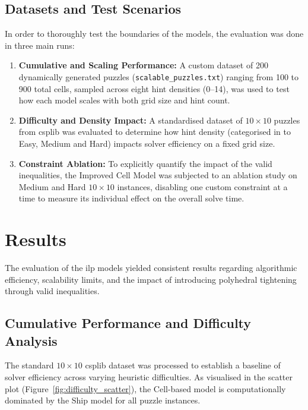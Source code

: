 \subsection{Datasets and Test Scenarios}\label{subsec:datasets-test-scenarios}
In order to thoroughly test the boundaries of the models, the evaluation was done in three main runs:
\begin{enumerate}
  \item \textbf{Cumulative and Scaling Performance:} A custom dataset of \num{200} dynamically generated puzzles (\verb|scalable_puzzles.txt|) ranging from \num{100} to \num{900} total cells, sampled across eight hint densities (0--14), was used to test how each model scales with both grid size and hint count.
  \item \textbf{Difficulty and Density Impact:} A standardised dataset of $10 \times 10$ puzzles from \gls{csplib} \citep{csplib:prob014} was evaluated to determine how hint density (categorised in to Easy, Medium and Hard) impacts solver efficiency on a fixed grid size.
  \item \textbf{Constraint Ablation:} To explicitly quantify the impact of the valid inequalities, the Improved Cell Model was subjected to an ablation study on Medium and Hard $10 \times 10$ instances, disabling one custom constraint at a time to measure its individual effect on the overall solve time.
\end{enumerate}

\section{Results}\label{sec:results}

The evaluation of the \gls{ilp} models yielded consistent results regarding algorithmic efficiency, scalability limits, and the impact of introducing polyhedral tightening through valid inequalities.

\subsection{Cumulative Performance and Difficulty Analysis}\label{subsec:cumulative-performance}
The standard $10 \times 10$ \gls{csplib} dataset was processed to establish a baseline of solver efficiency across varying heuristic difficulties. As visualised in the scatter plot (Figure~\ref{fig:difficulty_scatter}), the Cell-based model is computationally dominated by the Ship model for all puzzle instances.

